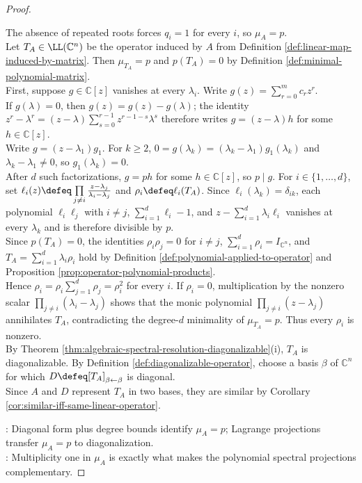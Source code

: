 \begin{theorem}
\begin{proof}
\begin{enumerate}[label=(\roman*)]
The absence of repeated roots forces $q_i=1$ for every $i$, so $\mu_A=p$.\\
Let $T_A\in\LL(\mathbb{C}^n)$ be the operator induced by $A$ from Definition \ref{def:linear-map-induced-by-matrix}. Then $\mu_{T_A}=p$ and $p(T_A)=0$ by Definition \ref{def:minimal-polynomial-matrix}.\\
First, suppose $g\in\mathbb{C}[z]$ vanishes at every $\lambda_i$. Write $g(z)=\sum\limits_{r=0}^{m}c_rz^r$.\\
If $g(\lambda)=0$, then $g(z)=g(z)-g(\lambda)$; the identity $z^r-\lambda^r=(z-\lambda)\sum\limits_{s=0}^{r-1}z^{r-1-s}\lambda^s$ therefore writes $g=(z-\lambda)h$ for some $h\in\mathbb{C}[z]$.\\
Write $g=(z-\lambda_1)g_1$. For $k\geq2$, $0=g(\lambda_k)=(\lambda_k-\lambda_1)g_1(\lambda_k)$ and $\lambda_k-\lambda_1\neq0$, so $g_1(\lambda_k)=0$.\\
After $d$ such factorizations, $g=ph$ for some $h\in\mathbb{C}[z]$, so $p\mid g$. For $i\in\{1,\ldots,d\}$, set $\ell_i(z)\defeq\prod\limits_{j\neq i}\frac{z-\lambda_j}{\lambda_i-\lambda_j}$ and $\rho_i\defeq\ell_i(T_A)$. Since $\ell_i(\lambda_k)=\delta_{ik}$, each polynomial $\ell_i\ell_j$ with $i\neq j$, $\sum\limits_{i=1}^{d}\ell_i-1$, and $z-\sum\limits_{i=1}^{d}\lambda_i\ell_i$ vanishes at every $\lambda_k$ and is therefore divisible by $p$.\\
Since $p(T_A)=0$, the identities $\rho_i\rho_j=0$ for $i\neq j$, $\sum\limits_{i=1}^{d}\rho_i=I_{\mathbb{C}^n}$, and $T_A=\sum\limits_{i=1}^{d}\lambda_i\rho_i$ hold by Definition \ref{def:polynomial-applied-to-operator} and Proposition \ref{prop:operator-polynomial-products}.\\
Hence $\rho_i=\rho_i\sum\limits_{j=1}^{d}\rho_j=\rho_i^2$ for every $i$. If $\rho_i=0$, multiplication by the nonzero scalar $\prod\limits_{j\neq i}(\lambda_i-\lambda_j)$ shows that the monic polynomial $\prod\limits_{j\neq i}(z-\lambda_j)$ annihilates $T_A$, contradicting the degree-$d$ minimality of $\mu_{T_A}=p$. Thus every $\rho_i$ is nonzero.\\
By Theorem \ref{thm:algebraic-spectral-resolution-diagonalizable}(i), $T_A$ is diagonalizable. By Definition \ref{def:diagonalizable-operator}, choose a basis $\beta$ of $\mathbb{C}^n$ for which $D\defeq[T_A]_{\beta\leftarrow\beta}$ is diagonal.\\
Since $A$ and $D$ represent $T_A$ in two bases, they are similar by Corollary \ref{cor:similar-iff-same-linear-operator}.
\end{enumerate}
: Diagonal form plus degree bounds identify $\mu_A=p$; Lagrange projections transfer $\mu_A=p$ to diagonalization.\\
: Multiplicity one in $\mu_A$ is exactly what makes the polynomial spectral projections complementary.
\end{proof}
\end{theorem}

